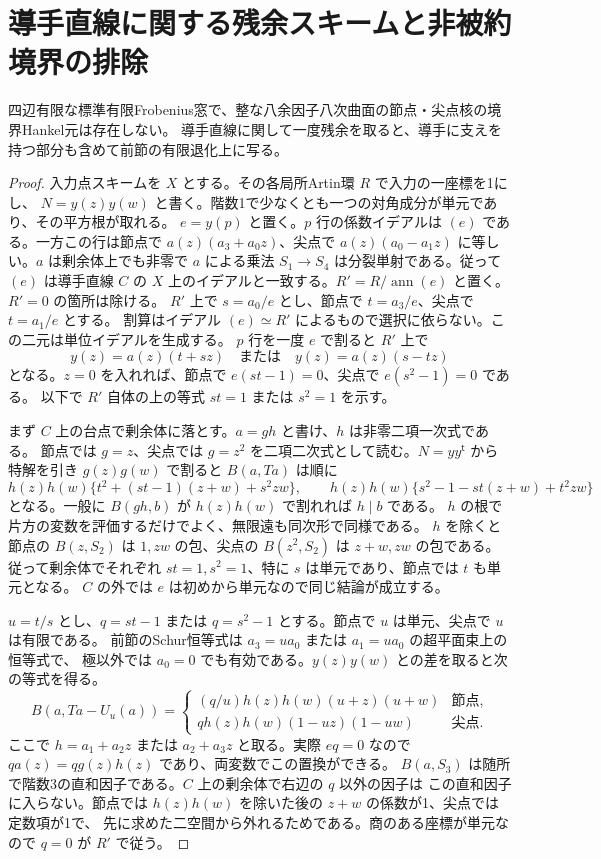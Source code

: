 \section{導手直線に関する残余スキームと非被約境界の排除}
\label{sec:boundary-conductor-residual}
\begin{theorem}\label{thm:boundary-conductor-residual}
四辺有限な標準有限Frobenius窓で、整な八余因子八次曲面の節点・尖点核の境界Hankel元は存在しない。
導手直線に関して一度残余を取ると、導手に支えを持つ部分も含めて前節の有限退化上に写る。
\end{theorem}
\begin{proof}
入力点スキームを $X$ とする。その各局所Artin環 $R$ で入力の一座標を1にし、
$N=y(z)y(w)$ と書く。階数1で少なくとも一つの対角成分が単元であり、その平方根が取れる。
$e=y(p)$ と置く。$p$ 行の係数イデアルは $(e)$ である。一方この行は節点で
$a(z)(a_3+a_0z)$、尖点で $a(z)(a_0-a_1z)$ に等しい。$a$ は剰余体上でも非零で
$a$ による乗法 $S_1\to S_4$ は分裂単射である。従って $(e)$ は導手直線 $C$ の
$X$ 上のイデアルと一致する。$R'=R/\operatorname{ann}(e)$ と置く。$R'=0$ の箇所は除ける。
$R'$ 上で $s=a_0/e$ とし、節点で $t=a_3/e$、尖点で $t=a_1/e$ とする。
割算はイデアル $(e)\simeq R'$ によるもので選択に依らない。この二元は単位イデアルを生成する。
$p$ 行を一度 $e$ で割ると $R'$ 上で
\[
 y(z)=a(z)(t+sz)\quad\text{または}\quad y(z)=a(z)(s-tz)
\]
となる。$z=0$ を入れれば、節点で $e(st-1)=0$、尖点で $e(s^2-1)=0$ である。
以下で $R'$ 自体の上の等式 $st=1$ または $s^2=1$ を示す。

まず $C$ 上の台点で剰余体に落とす。$a=g h$ と書け、$h$ は非零二項一次式である。
節点では $g=z$、尖点では $g=z^2$ を二項二次式として読む。$N=yy^{\mathsf t}$ から特解を引き
$g(z)g(w)$ で割ると $B(a,Ta)$ は順に
\[
 h(z)h(w)\{t^2+(st-1)(z+w)+s^2zw\},\qquad
 h(z)h(w)\{s^2-1-st(z+w)+t^2zw\}
\]
となる。一般に $B(gh,b)$ が $h(z)h(w)$ で割れれば $h\mid b$ である。
$h$ の根で片方の変数を評価するだけでよく、無限遠も同次形で同様である。
$h$ を除くと節点の $B(z,S_2)$ は $1,zw$ の包、尖点の $B(z^2,S_2)$ は $z+w,zw$ の包である。
従って剰余体でそれぞれ $st=1,s^2=1$、特に $s$ は単元であり、節点では $t$ も単元となる。
$C$ の外では $e$ は初めから単元なので同じ結論が成立する。

$u=t/s$ とし、$q=st-1$ または $q=s^2-1$ とする。節点で $u$ は単元、尖点で $u$ は有限である。
前節のSchur恒等式は $a_3=u a_0$ または $a_1=u a_0$ の超平面束上の恒等式で、
極以外では $a_0=0$ でも有効である。$y(z)y(w)$ との差を取ると次の等式を得る。
\[
 B(a,Ta-U_u(a))=
 \begin{cases}
 (q/u) h(z)h(w)(u+z)(u+w)&\text{節点},\\
 q h(z)h(w)(1-uz)(1-uw)&\text{尖点}.
 \end{cases}
\]
ここで $h=a_1+a_2z$ または $a_2+a_3z$ と取る。実際 $eq=0$ なので
$q a(z)=q g(z)h(z)$ であり、両変数でこの置換ができる。
$B(a,S_3)$ は随所で階数3の直和因子である。$C$ 上の剰余体で右辺の $q$ 以外の因子は
この直和因子に入らない。節点では $h(z)h(w)$ を除いた後の $z+w$ の係数が1、尖点では定数項が1で、
先に求めた二空間から外れるためである。商のある座標が単元なので $q=0$ が $R'$ で従う。


\end{proof}
